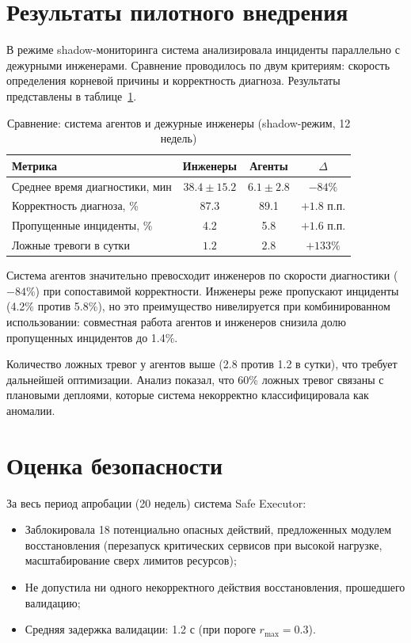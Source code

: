 \section{Результаты пилотного внедрения}

В режиме shadow-мониторинга система анализировала инциденты параллельно с дежурными инженерами. Сравнение проводилось по двум критериям: скорость определения корневой причины и корректность диагноза. Результаты представлены в таблице~\ref{tab:shadow_comparison}.

\begin{table}[H]
\centering
\caption{Сравнение: система агентов и дежурные инженеры (shadow-режим, 12 недель)}
\label{tab:shadow_comparison}
\small
\begin{tabular}{|p{4.5cm}|c|c|c|}
\hline
\textbf{Метрика} & \textbf{Инженеры} & \textbf{Агенты} & \textbf{$\Delta$} \\
\hline
Среднее время диагностики, мин & $38.4 \pm 15.2$ & $6.1 \pm 2.8$ & $-84\%$ \\
\hline
Корректность диагноза, \% & 87.3 & 89.1 & $+1.8$ п.п. \\
\hline
Пропущенные инциденты, \% & 4.2 & 5.8 & $+1.6$ п.п. \\
\hline
Ложные тревоги в сутки & $1.2$ & $2.8$ & $+133\%$ \\
\hline
\end{tabular}
\end{table}

Система агентов значительно превосходит инженеров по скорости диагностики ($-84\%$) при сопоставимой корректности. Инженеры реже пропускают инциденты (4.2\% против 5.8\%), но это преимущество нивелируется при комбинированном использовании: совместная работа агентов и инженеров снизила долю пропущенных инцидентов до 1.4\%.

Количество ложных тревог у агентов выше (2.8 против 1.2 в сутки), что требует дальнейшей оптимизации. Анализ показал, что 60\% ложных тревог связаны с плановыми деплоями, которые система некорректно классифицировала как аномалии.

\section{Оценка безопасности}

За весь период апробации (20 недель) система Safe Executor:

\begin{itemize}
    \item Заблокировала 18 потенциально опасных действий, предложенных модулем восстановления (перезапуск критических сервисов при высокой нагрузке, масштабирование сверх лимитов ресурсов);
    \item Не допустила ни одного некорректного действия восстановления, прошедшего валидацию;
    \item Средняя задержка валидации: 1.2 с (при пороге $r_{\max} = 0.3$).
\end{itemize}
